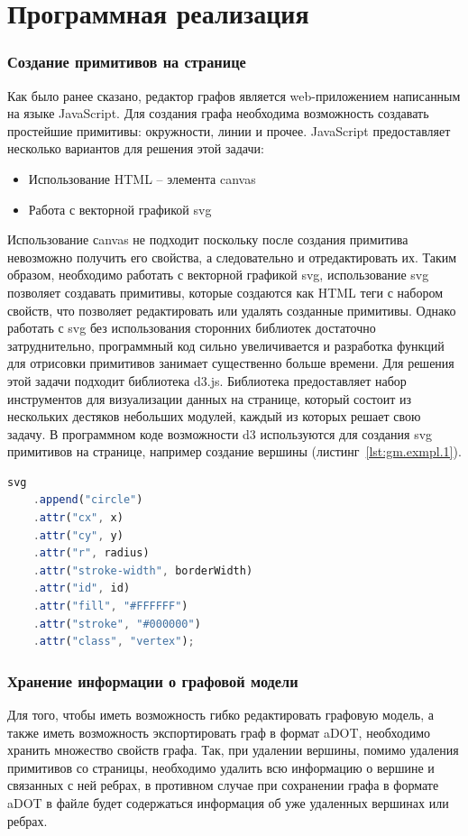 \chapter{Программная реализация}\label{chap3_soft_architecture}
\subsection{Создание примитивов на странице}
Как было ранее сказано, редактор графов является web-приложением написанным на языке JavaScript. Для создания графа необходима возможность создавать простейшие примитивы: окружности, линии и прочее. JavaScript предоставляет несколько вариантов для решения этой задачи:
\begin{itemize}
	\item Использование HTML -- элемента canvas
	\item Работа с векторной графикой svg
\end{itemize}
Использование сanvas не подходит поскольку после создания примитива невозможно получить его свойства, а следовательно и отредактировать их. Таким образом, необходимо работать с векторной графикой svg, использование svg позволяет создавать примитивы, которые создаются как HTML теги с набором свойств, что позволяет редактировать или удалять созданные примитивы. Однако работать с svg без использования сторонних библиотек достаточно затруднительно, программный код сильно увеличивается и разработка функций для отрисовки примитивов занимает существенно больше времени. Для решения этой задачи подходит библиотека d3.js. Библиотека предоставляет набор инструментов для визуализации данных на странице, который состоит из нескольких дестяков небольших модулей, каждый из которых решает свою задачу. В программном коде возможности d3 используются для создания svg примитивов на странице, например создание вершины (листинг~\ref{lst:gm.exmpl.1}).

\begin{lstlisting}[label={lst:gm.exmpl.1}, caption={Пример создание вершины с использование библиотеки d3}, language=JavaScript]
  svg
    .append("circle")
    .attr("cx", x)
    .attr("cy", y)
    .attr("r", radius)
    .attr("stroke-width", borderWidth)
    .attr("id", id)
    .attr("fill", "#FFFFFF")
    .attr("stroke", "#000000")
    .attr("class", "vertex");
\end{lstlisting}

\subsection{Хранение информации о графовой модели}
Для того, чтобы иметь возможность гибко редактировать графовую модель, а также иметь возможность экспортировать граф в формат aDOT, необходимо хранить множество свойств графа. Так, при удалении вершины, помимо удаления примитивов со страницы, необходимо удалить всю информацию о вершине и связанных с ней ребрах, в противном случае при сохранении графа в формате aDOT в файле будет содержаться информация об уже удаленных вершинах или ребрах.

